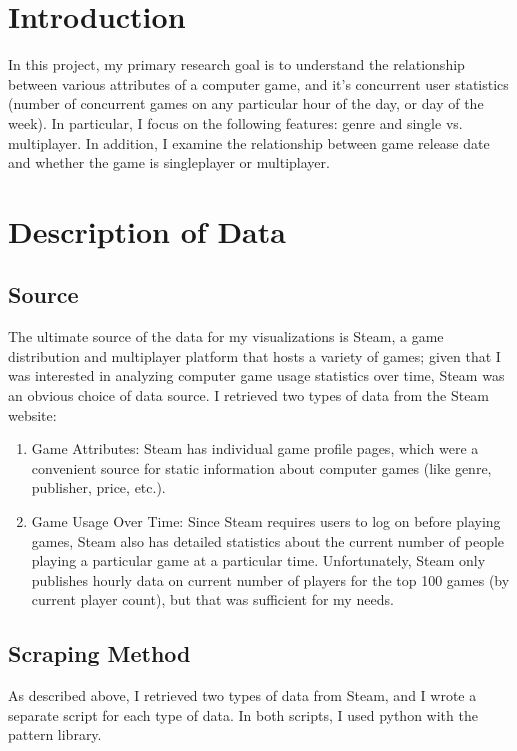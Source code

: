 \documentclass[pdftex,12pt,a4paper]{article}
\begin{document}

\tableofcontents
\pagebreak

\section{Introduction}
In this project, my primary research goal is to understand the relationship between various attributes of a computer game, and it's concurrent user statistics (number of concurrent games on any particular hour of the day, or day of the week). In particular, I focus on the following features: genre and single vs. multiplayer. In addition, I examine the relationship between game release date and whether the game is singleplayer or multiplayer.
\section{Description of Data}
\subsection{Source}
The ultimate source of the data for my visualizations is Steam, a game distribution and multiplayer platform that hosts a variety of games; given that I was interested in analyzing computer game usage statistics over time, Steam was an obvious choice of data source. I retrieved two types of data from the Steam website:
\begin{enumerate} 
\item Game Attributes: Steam has individual game profile pages, which were a convenient source for static information about computer games (like genre, publisher, price, etc.). 
\item Game Usage Over Time: Since Steam requires users to log on before playing games, Steam also has detailed statistics about the current number of people playing a particular game at a particular time. Unfortunately, Steam only publishes hourly data on current number of players for the top 100 games (by current player count), but that was sufficient for my needs.
\end{enumerate}
\subsection{Scraping Method}
As described above, I retrieved two types of data from Steam, and I wrote a separate script for each type of data. In both scripts, I used python with the pattern library.
\end{document}

